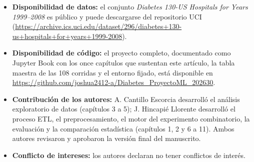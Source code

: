 \documentclass[pdflatex,sn-mathphys-num]{sn-jnl}
\begin{document}
\begin{itemize}
\item \textbf{Disponibilidad de datos:} el conjunto \emph{Diabetes 130-US Hospitals for Years 1999--2008} es público y puede descargarse del repositorio UCI (\url{https://archive.ics.uci.edu/dataset/296/diabetes+130-us+hospitals+for+years+1999-2008}).
\item \textbf{Disponibilidad de código:} el proyecto completo, documentado como Jupyter Book con los once capítulos que sustentan este artículo, la tabla maestra de las 108 corridas y el entorno fijado, está disponible en \url{https://github.com/joshua2412-a/Diabetes_ProyectoML_202630}.
\item \textbf{Contribución de los autores:} A. Cantillo Escorcia desarrolló el análisis exploratorio de datos (capítulos 3 a 5); J. Hincapié Llorente desarrolló el proceso ETL, el preprocesamiento, el motor del experimento combinatorio, la evaluación y la comparación estadística (capítulos 1, 2 y 6 a 11). Ambos autores revisaron y aprobaron la versión final del manuscrito.
\item \textbf{Conflicto de intereses:} los autores declaran no tener conflictos de interés.
\end{itemize}


\end{document}
